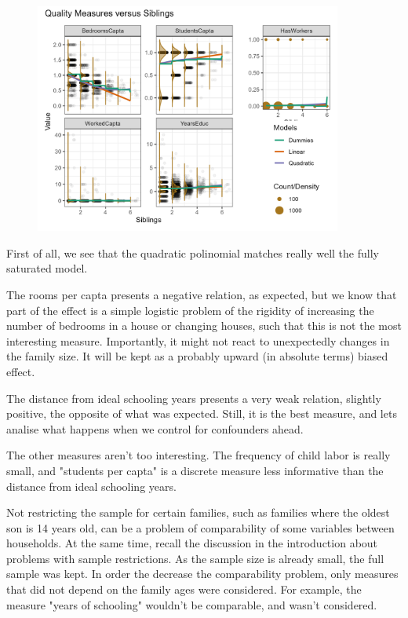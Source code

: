 \documentclass[12pt]{article}
\begin{document}
\begin{figure}
    \centering
    \includegraphics[width=0.9\textwidth]{Figures/quality.png}
    \label{fig:quality}
\end{figure}

First of all, we see that the quadratic polinomial matches really well the fully saturated model.

The rooms per capta presents a negative relation, as expected, but we know that part of the effect is a simple logistic problem of the rigidity of increasing the number of bedrooms in a house or changing houses, such that this is not the most interesting measure. Importantly, it might not react to unexpectedly changes in the family size. It will be kept as a probably upward (in absolute terms) biased effect.

The distance from ideal schooling years presents a very weak relation, slightly positive, the opposite of what was expected. Still, it is the best measure, and lets analise what happens when we control for confounders ahead.

The other measures aren't too interesting. The frequency of child labor is really small, and "students per capta" is a discrete measure less informative than the distance from ideal schooling years.

Not restricting the sample for certain families, such as families where the oldest son is 14 years old, can be a problem of comparability of some variables between households. At the same time, recall the discussion in the introduction about problems with sample restrictions. As the sample size is already small, the full sample was kept. In order the decrease the comparability problem, only measures that did not depend on the family ages were considered. For example, the measure "years of schooling" wouldn't be comparable, and wasn't considered.
\end{document}
